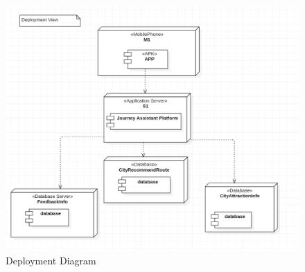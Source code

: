 \documentclass[10pt]{article}
\begin{document}
\begin{figure}[H]
    \centering
    
    \includegraphics[width=14cm]{deploy.png}
    \caption{Deployment Diagram}
    \label{Deployment Diagram}
\end{figure}
\end{document}
